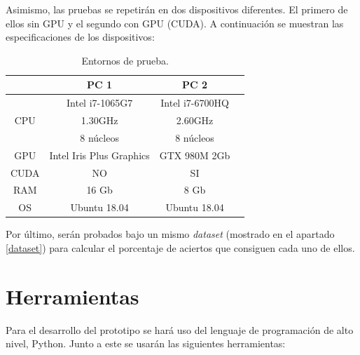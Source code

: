 Asimismo, las pruebas se repetirán en dos dispositivos diferentes. El primero de ellos sin GPU y el segundo con GPU (CUDA). A continuación se muestran las especificaciones de los dispositivos:

\begin{table}[h!]
	\begin{center}
		\begin{tabular}{ |c|c|c|c| } 
			\hline
			 & PC 1 & PC 2 \\
			\hline
			\multirow{3}{4em}{CPU} & Intel i7-1065G7 & Intel i7-6700HQ \\ 
			& 1.30GHz & 2.60GHz \\ 
			& 8 núcleos & 8 núcleos \\ 
			\hline
			GPU & Intel Iris Plus Graphics  & GTX 980M 2Gb \\
			\hline
			CUDA & NO  & SI \\
			\hline
			RAM & 16 Gb & 8 Gb \\
			\hline
			OS & Ubuntu 18.04 & Ubuntu 18.04 \\
			\hline
		\end{tabular}
		\caption{Entornos de prueba.}
		\label{tab:table1}
	\end{center}
\end{table}

Por último, serán probados bajo un mismo \textit{dataset} (mostrado en el apartado \ref{dataset}) para calcular el porcentaje de aciertos que consiguen cada uno de ellos.

\section*{Herramientas}

Para el desarrollo del prototipo se hará uso del lenguaje de programación de alto nivel, Python. Junto a este se usarán las siguientes herramientas:

